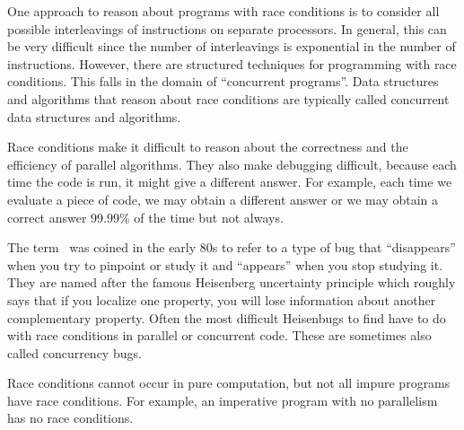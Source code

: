 \begin{cluster}
\label{grp:grm:language::functional-algorithms::approach}

\begin{gram}
\label{grm:language::functional-algorithms::approach}
One approach to reason about programs with race conditions is to
consider all possible interleavings of instructions on separate
processors.  In general, this can be very difficult since the number
of interleavings is exponential in the number of instructions.
However, there are structured techniques for programming with race
conditions.  This falls in the domain of ``concurrent programs''.
Data structures and algorithms that reason about race conditions are
typically called concurrent data structures and algorithms.

\end{gram}
\end{cluster}

\begin{cluster}
\label{grp:rmrk:language::functional-algorithms::heisenbug}

\begin{remark}[Heisenbug]
\label{rmrk:language::functional-algorithms::heisenbug}
Race conditions make it difficult to reason about the correctness and
the efficiency of parallel algorithms.  They also make debugging
difficult, because each time the code is run, it might give a
different answer.
For example, each time we evaluate a piece of code, we may obtain a
different answer or we may obtain a correct answer 99.99\% of the time
but not always.

The term~ was coined in the early 80s to refer to a
type of bug that ``disappears'' when you try to pinpoint or study it
and ``appears'' when you stop studying it.  They are named after the
famous Heisenberg uncertainty principle which roughly says that if you
localize one property, you will lose information about another
complementary property.  Often the most difficult Heisenbugs to find
have to do with race conditions in parallel or concurrent code.  These
are sometimes also called concurrency bugs.

\end{remark}
\end{cluster}

\begin{cluster}
\label{grp:grm:language::functional-algorithms::conditions}

\begin{gram}
\label{grm:language::functional-algorithms::conditions}
Race conditions cannot occur in pure computation, but not all
impure programs have race conditions.  For example, an imperative
program with no parallelism has no race conditions.

\end{gram}
\end{cluster}


